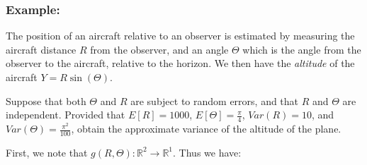 \documentclass{article}
\begin{document}
     \subsubsection*{Example:}
     
     The position of an aircraft relative to an observer is estimated by measuring the aircraft distance $R$ from the observer, and an angle $\Theta$ which is the angle from the observer to the aircraft, relative to the horizon.  We then have the \textit{altitude} of the aircraft $Y = R\sin (\Theta)$.
     
     Suppose that both $\Theta$ and $R$ are subject to random errors, and that $R$ and $\Theta$ are independent. Provided that $E[R] = 1000$, $E[\Theta] = \frac{\pi}{4}$, $Var(R) = 10$, and $Var(\Theta) = \frac{\pi^2}{100}$, obtain the approximate variance of the altitude of the plane. 
     
     First, we note that $g(R,\Theta):\mathbb{R}^2 \rightarrow \mathbb{R}^1$. Thus we have:
     
\end{document}
